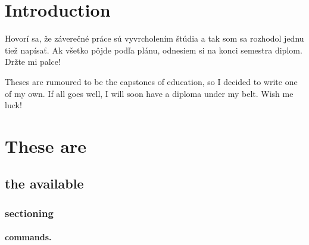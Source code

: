 \documentclass[
  digital, %
  table,   %
  lof,     %
  lot,     %
]{fithesis3}
\begin{document}
\chapter{Introduction}
Hovorí sa, že záverečné práce sú vyvrcholením štúdia a tak som sa
rozhodol jednu tiež napísať. Ak všetko pôjde podľa plánu, odnesiem
si na konci semestra diplom. Držte mi palce!

\begin{otherlanguage}{english}
Theses are rumoured to be the capstones of education, so I decided
to write one of my own. If all goes well, I will soon have a
diploma under my belt. Wish me luck!
\end{otherlanguage}

\chapter{These are}
\section{the available}
\subsection{sectioning}
\subsubsection{commands.}
\end{document}
